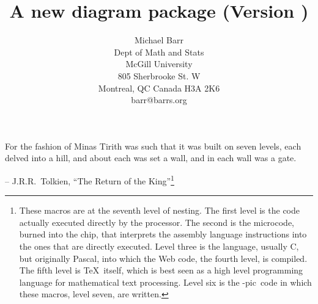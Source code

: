 \documentclass[12pt]{article}
\begin{document}
\def\xypic{\hbox{\rm\Xy-pic}}

\title{A new diagram package (Version \thedate)}
\author{Michael Barr\\Dept of Math and Stats\\McGill University\\805
Sherbrooke St. W\\Montreal, QC Canada H3A 2K6\\[5pt] barr@barrs.org}
 \date{}
 \maketitle

\makeatletter
{}
\makeatother

\kern 40pt
{\narrower
For the fashion of Minas Tirith was such that it was built on seven levels,
each delved into a hill, and about each was set a wall, and in each wall
was a gate.

-- J.R.R.\ Tolkien, ``The Return of the King''\footnote{These macros are
at the seventh level of nesting.  The first level is the code actually
executed directly by the processor.  The second is the microcode, burned
into the chip, that interprets the assembly language instructions into
the ones that are directly executed.  Level three is the language,
usually C, but originally Pascal, into which the Web code, the fourth
level, is compiled.  The fifth level is \TeX\ itself, which is best seen
as a high level programming language for mathematical text processing.
Level six is the \xypic\ code in which these macros, level seven, are
written.}

}
\end{document}
